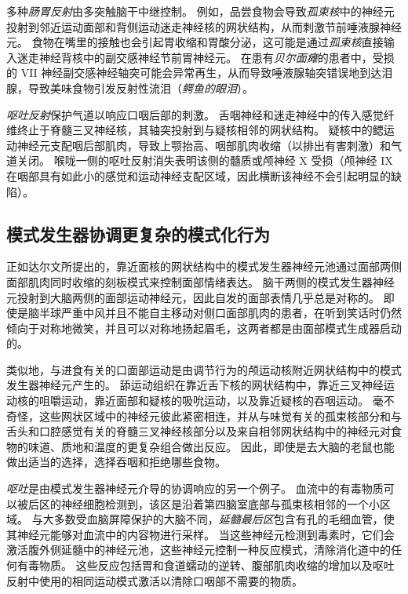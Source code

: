 多种\textit{肠胃反射}由多突触脑干中继控制。
例如，品尝食物会导致\textit{孤束核}中的神经元投射到邻近运动面部和背侧运动迷走神经核的网状结构，从而刺激节前唾液腺神经元。
食物在嘴里的接触也会引起胃收缩和胃酸分泌，这可能是通过\textit{孤束核}直接输入迷走神经背核中的副交感神经节前胃神经元。
在患有\textit{贝尔面瘫}的患者中，受损的 VII 神经副交感神经轴突可能会异常再生，从而导致唾液腺轴突错误地到达泪腺，导致美味食物引发反射性流泪（\textit{鳄鱼的眼泪}）。


\textit{呕吐反射}保护气道以响应口咽后部的刺激。
舌咽神经和迷走神经中的传入感觉纤维终止于脊髓三叉神经核，其轴突投射到与疑核相邻的网状结构。
疑核中的鳃运动神经元支配咽后部肌肉，导致上颚抬高、咽部肌肉收缩（以排出有害刺激）和气道关闭。
喉咙一侧的呕吐反射消失表明该侧的髓质或颅神经 X 受损（颅神经 IX 在咽部具有如此小的感觉和运动神经支配区域，因此横断该神经不会引起明显的缺陷）。



\subsection{模式发生器协调更复杂的模式化行为}

正如达尔文所提出的，靠近面核的网状结构中的模式发生器神经元池通过面部两侧面部肌肉同时收缩的刻板模式来控制面部情绪表达。
脑干两侧的模式发生器神经元投射到大脑两侧的面部运动神经元，因此自发的面部表情几乎总是对称的。
即使是脑半球严重中风并且不能自主移动对侧口面部肌肉的患者，在听到笑话时仍然倾向于对称地微笑，并且可以对称地扬起眉毛，这两者都是由面部模式生成器启动的。


类似地，与进食有关的口面部运动是由调节行为的颅运动核附近网状结构中的模式发生器神经元产生的。
舔运动组织在靠近舌下核的网状结构中，靠近三叉神经运动核的咀嚼运动，靠近面部和疑核的吸吮运动，以及靠近疑核的吞咽运动。
毫不奇怪，这些网状区域中的神经元彼此紧密相连，并从与味觉有关的孤束核部分和与舌头和口腔感觉有关的脊髓三叉神经核部分以及来自相邻网状结构中的神经元对食物的味道、质地和温度的更复杂组合做出反应。
因此，即使是去大脑的老鼠也能做出适当的选择，选择吞咽和拒绝哪些食物。


\textit{呕吐}是由模式发生器神经元介导的协调响应的另一个例子。
血流中的有毒物质可以被后区的神经细胞检测到，该区是沿着第四脑室底部与孤束核相邻的一个小区域。
与大多数受血脑屏障保护的大脑不同，\textit{延髓最后区}包含有孔的毛细血管，使其神经元能够对血流中的内容物进行采样。
当这些神经元检测到毒素时，它们会激活腹外侧延髓中的神经元池，这些神经元控制一种反应模式，清除消化道中的任何有毒物质。
这些反应包括胃和食道蠕动的逆转、腹部肌肉收缩的增加以及呕吐反射中使用的相同运动模式激活以清除口咽部不需要的物质。



